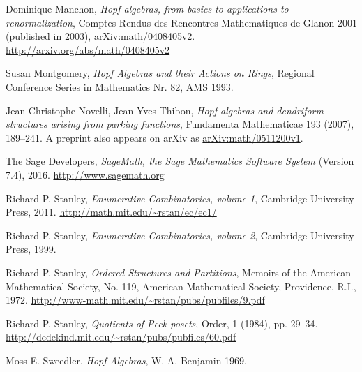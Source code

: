 \documentclass[numbers=enddot,12pt,final,onecolumn,notitlepage,abstracton]{scrartcl}%
\theoremstyle{definition}
\begin{document}
\begin{thebibliography}{99999999}
Dominique Manchon, \textit{Hopf algebras, from
basics to applications to renormalization}, Comptes Rendus des Rencontres
Mathematiques de Glanon 2001 (published in 2003), arXiv:math/0408405v2.\newline%
\url{http://arxiv.org/abs/math/0408405v2}

Susan Montgomery, \textit{Hopf Algebras and their
Actions on Rings}, Regional Conference Series in Mathematics Nr. 82, AMS 1993.

 Jean-Christophe Novelli, Jean-Yves Thibon,
\textit{Hopf algebras and dendriform structures arising from parking functions},
Fundamenta Mathematicae 193 (2007), 189--241. A preprint also appears
on arXiv as \href{http://arxiv.org/abs/math/0511200v1}{arXiv:math/0511200v1}.

The Sage Developers, \textit{SageMath,
the Sage Mathematics Software System} (Version 7.4), 2016.
\url{http://www.sagemath.org}

Richard P. Stanley, \textit{Enumerative
Combinatorics, volume 1}, Cambridge University Press, 2011. \newline%
\url{http://math.mit.edu/~rstan/ec/ec1/}

Richard P. Stanley, \textit{Enumerative
Combinatorics, volume 2}, Cambridge University Press, 1999.

Richard P. Stanley, \textit{Ordered Structures and
Partitions}, Memoirs of the American Mathematical Society, No. 119, American
Mathematical Society, Providence, R.I., 1972. \newline
\url{http://www-math.mit.edu/~rstan/pubs/pubfiles/9.pdf}

Richard P. Stanley,
\textit{Quotients of Peck posets}, Order, 1 (1984), pp. 29--34. \newline
\url{http://dedekind.mit.edu/~rstan/pubs/pubfiles/60.pdf}

Moss E. Sweedler, \textit{Hopf Algebras},
W. A. Benjamin 1969.

\end{thebibliography}
\end{document}
